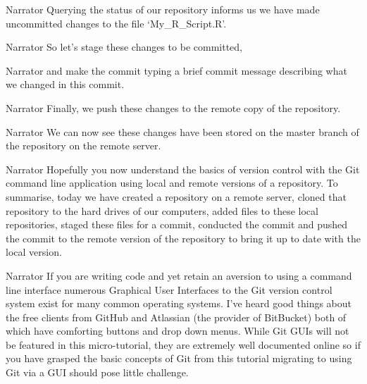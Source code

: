 \documentclass{screenplay} %
\begin{document}
\begin{dialogue}{Narrator}
Querying the status of our repository informs us we have made uncommitted changes to the file `My\_R\_Script.R'.
\end{dialogue}

\begin{dialogue}{Narrator}
So let's stage these changes to be committed,
\end{dialogue}

\begin{dialogue}{Narrator}
and make the commit typing a brief commit message describing what we changed in this commit.
\end{dialogue}

\begin{dialogue}{Narrator}
Finally, we push these changes to the remote copy of the repository.
\end{dialogue}

\begin{dialogue}{Narrator}
We can now see these changes have been stored on the master branch of the repository on the remote server.
\end{dialogue}

\begin{dialogue}{Narrator}
Hopefully you now understand the basics of version control with the Git command line application using local and remote versions of a repository. %
To summarise, today we have created a repository on a remote server, cloned that repository to the hard drives of our computers, added files to these local repositories, staged these files for a commit, conducted the commit and pushed the commit to the remote version of the repository to bring it up to date with the local version.
\end{dialogue}

\begin{dialogue}{Narrator}
If you are writing code and yet retain an aversion to using a command line interface numerous Graphical User Interfaces to the Git version control system exist for many common operating systems.
\newline
\newline
I've heard good things about the free clients from GitHub and Atlassian (the provider of BitBucket) both of which have comforting buttons and drop down menus.
While Git GUIs will not be featured in this micro-tutorial, they are extremely well documented online so if you have grasped the basic concepts of Git from this tutorial migrating to using Git via a GUI should pose little challenge.
\end{dialogue}
\end{document}
